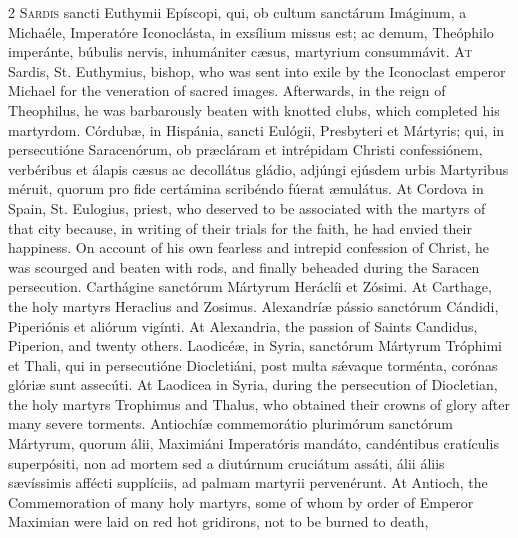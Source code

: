\begin{paracol}{2}
\lettrine[lines=2]{S}{ardis} sancti Euthymii Epíscopi, qui, ob cultum sanctárum Imáginum, a 
 Michaéle, Imperatóre Iconoclásta, in exsílium missus est; ac demum, 
 Theóphilo imperánte, búbulis nervis, 
 inhumániter cæsus, martyrium consummávit.
\switchcolumn
{}
\lettrine[lines=2]{A}{t} Sardis, St. Euthymius, bishop, who was sent into exile by the Iconoclast 
 emperor Michael for the veneration of sacred images. Afterwards, in 
 the reign of Theophilus, he was barbarously beaten with knotted clubs, which 
 completed his martyrdom.
\switchcolumn*
{}
Córdubæ, in Hispánia, sancti Eulógii, 
 Presbyteri et Mártyris; qui, in persecutióne Saracenórum, ob præcláram et 
 intrépidam Christi confessiónem, verbéribus et álapis cæsus ac decollátus 
 gládio, adjúngi ejúsdem urbis Martyribus méruit, quorum pro fide certámina 
 scribéndo fúerat æmulátus.
\switchcolumn
{}
At Cordova in Spain, St. Eulogius, priest, who deserved to be associated 
 with the martyrs of that city because, in writing of their trials for the 
 faith, he had envied their happiness. On account of his own fearless 
 and intrepid confession of Christ, he was scourged and beaten with rods, and 
 finally beheaded during the Saracen persecution.
\switchcolumn*
{}
Carthágine sanctórum Mártyrum Heráclíi et 
 Zósimi.
\switchcolumn
{}
At Carthage, the holy martyrs Heraclius and Zosimus.
\switchcolumn*
{}
Alexandríæ pássio sanctórum Cándidi, Piperiónis 
 et aliórum vigínti.
\switchcolumn
{}
At Alexandria, the passion of Saints Candidus, Piperion, and twenty others.
\switchcolumn*
{}
Laodicéæ, in Syria, sanctórum Mártyrum Tróphimi 
 et Thali, qui in persecutióne Diocletiáni, post multa sǽvaque torménta, 
 corónas glóriæ sunt assecúti.
\switchcolumn
{}
At Laodicea in Syria, during the persecution of Diocletian, the holy martyrs 
 Trophimus and Thalus, who obtained their crowns of glory after many severe 
 torments.
\switchcolumn*
{}
Antiochíæ commemorátio plurimórum sanctórum 
 Mártyrum, quorum álii, Maximiáni Imperatóris mandáto, candéntibus cratículis 
 superpósiti, non ad mortem sed a diutúrnum cruciátum assáti, álii áliis 
 sævíssimis affécti supplíciis, ad palmam martyrii pervenérunt.
\switchcolumn
{}
At Antioch, the Commemoration of many holy martyrs, some of whom by order of 
 Emperor Maximian were laid on red hot gridirons, not to be burned to death, 

\end{paracol}
